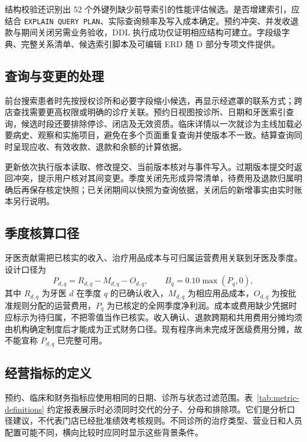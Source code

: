 \documentclass[12pt,a4paper,fontset=windows]{ctexart}
\begin{document}
结构校验还识别出 52 个外键列缺少前导索引的性能评估候选。是否增建索引，应结合 \texttt{EXPLAIN QUERY PLAN}、实际查询频率及写入成本确定。预约冲突、并发收退款与期间关闭另需业务验收，DDL 执行成功仅证明相应结构可建立。字段级字典、完整关系清单、候选索引脚本及可编辑 ERD 随 D 部分专项文件提供。

\subsection{查询与变更的处理}
前台搜索患者时先按授权诊所和必要字段缩小候选，再显示经遮罩的联系方式；跨店查找需要更高权限或明确的诊疗关联。预约日视图按诊所、日期和牙医索引查询，候选时段还要排除停诊、闭店及无效资质。临床详情以一次就诊为主线加载必要病史、观察和实施项目，避免在多个页面重复查询并使版本不一致。结算查询同时呈现应收、有效收款、退款和余额的计算依据。

更新依次执行版本读取、修改提交、当前版本核对与事件写入。过期版本提交时返回冲突，提示用户核对其间变更。季度关闭先形成异常清单，待费用及退款归属明确后再保存核定快照；已关闭期间以快照为查询依据，关闭后的新增事实由实时账本另行说明。

\subsection{季度核算口径}
牙医贡献需把已核实的收入、治疗用品成本与可归属运营费用关联到牙医及季度。设计口径为
\begin{equation}
P_{d,q}=R_{d,q}-M_{d,q}-O_{d,q},\qquad B_q=0.10\max(P_q,0),
\end{equation}
其中 $R_{d,q}$ 为牙医 $d$ 在季度 $q$ 的已确认收入，$M_{d,q}$ 为相应用品成本，$O_{d,q}$ 为按批准规则分配的运营费用，$P_q$ 为已核定的全网季度净利润。成本或费用缺少凭据时应标示为待归属，不把零值当作已核实。收入确认、退款跨期和共用费用分摊均须由机构确定制度后才能成为正式财务口径。现有程序尚未完成牙医级费用分摊，故不能宣称 $P_{d,q}$ 已完整可用。

\subsection{经营指标的定义}
预约、临床和财务指标应使用相同的日期、诊所与状态过滤范围。表~\ref{tab:metric-definitions} 约定报表展示时必须同时交代的分子、分母和排除项。它们是分析口径建议，不代表门店已经批准绩效考核规则。不同诊所的治疗类型、营业日和人员配置可能不同，横向比较时应同时显示这些背景条件。
\end{document}
